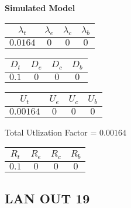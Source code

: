 \documentclass{article}
\begin{document}
\begin{minipage}{0.5\textwidth}
\centering	\textbf{Simulated Model}
\begin{table}[H]
\centering
\begin{tabular}{@{}cccc@{}}
\toprule
$\lambda_t$ & $\lambda_e$ & $\lambda_c$ & $\lambda_b$\\
\midrule
$0.0164$ & $0$ & $0$ & $0$\\
\bottomrule
\end{tabular}
\end{table}
\begin{table}[H]
\centering
\begin{tabular}{@{}cccc@{}}
\toprule
$D_t$ & $D_e$ & $D_c$ & $D_b$\\
\midrule
$0.1$ & $0$ & $0$ & $0$\\
\bottomrule
\end{tabular}
\end{table}\begin{table}[H]
\centering
\begin{tabular}{@{}cccc@{}}
\toprule
$U_t$ & $U_e$ & $U_c$ & $U_b$\\
\midrule
$0.00164$ & $0$ & $0$ & $0$\\
\bottomrule
\end{tabular}
\end{table}
\centering Total Utlization Factor = $0.00164$
\begin{table}[H]
\centering
\begin{tabular}{@{}cccc@{}}
\toprule
$R_t$ & $R_e$ & $R_c$ & $R_b$\\
\midrule
$0.1$ & $0$ & $0$ & $0$\\
\bottomrule
\end{tabular}
\end{table}
\end{minipage}\subsection{LAN OUT 19}
\end{document}
